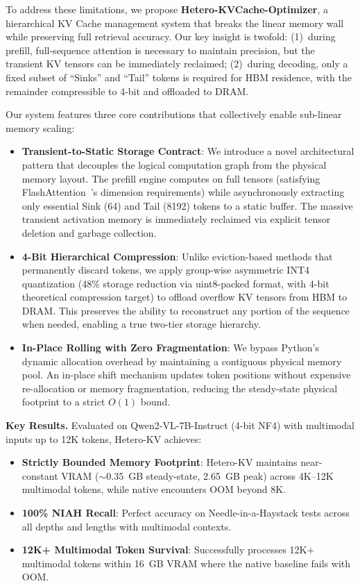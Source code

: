 To address these limitations, we propose \textbf{Hetero-KVCache-Optimizer}, a hierarchical KV Cache management system that breaks the linear memory wall while preserving full retrieval accuracy. Our key insight is twofold: (1)~during prefill, full-sequence attention is necessary to maintain precision, but the transient KV tensors can be immediately reclaimed; (2)~during decoding, only a fixed subset of ``Sinks'' and ``Tail'' tokens is required for HBM residence, with the remainder compressible to 4-bit and offloaded to DRAM.

Our system features three core contributions that collectively enable sub-linear memory scaling:

\begin{itemize}
    \item \textbf{Transient-to-Static Storage Contract}: We introduce a novel architectural pattern that decouples the logical computation graph from the physical memory layout. The prefill engine computes on full tensors (satisfying FlashAttention~\cite{dao2022flashattention}'s dimension requirements) while asynchronously extracting only essential Sink (64) and Tail (8192) tokens to a static buffer. The massive transient activation memory is immediately reclaimed via explicit tensor deletion and garbage collection.

    \item \textbf{4-Bit Hierarchical Compression}: Unlike eviction-based methods that permanently discard tokens, we apply group-wise asymmetric INT4 quantization (48\% storage reduction via uint8-packed format, with 4-bit theoretical compression target) to offload overflow KV tensors from HBM to DRAM. This preserves the ability to reconstruct any portion of the sequence when needed, enabling a true two-tier storage hierarchy.

    \item \textbf{In-Place Rolling with Zero Fragmentation}: We bypass Python's dynamic allocation overhead by maintaining a contiguous physical memory pool. An in-place shift mechanism updates token positions without expensive re-allocation or memory fragmentation, reducing the steady-state physical footprint to a strict $O(1)$ bound.
\end{itemize}

\textbf{Key Results.} Evaluated on Qwen2-VL-7B-Instruct (4-bit NF4) with multimodal inputs up to 12K tokens, Hetero-KV achieves:
\begin{itemize}
    \item \textbf{Strictly Bounded Memory Footprint}: Hetero-KV maintains near-constant VRAM ($\sim$0.35~GB steady-state, 2.65~GB peak) across 4K--12K multimodal tokens, while native encounters OOM beyond 8K.
    \item \textbf{100\% NIAH Recall}: Perfect accuracy on Needle-in-a-Haystack tests across all depths and lengths with multimodal contexts.
    \item \textbf{12K+ Multimodal Token Survival}: Successfully processes 12K+ multimodal tokens within 16~GB VRAM where the native baseline fails with OOM.
\end{itemize}


